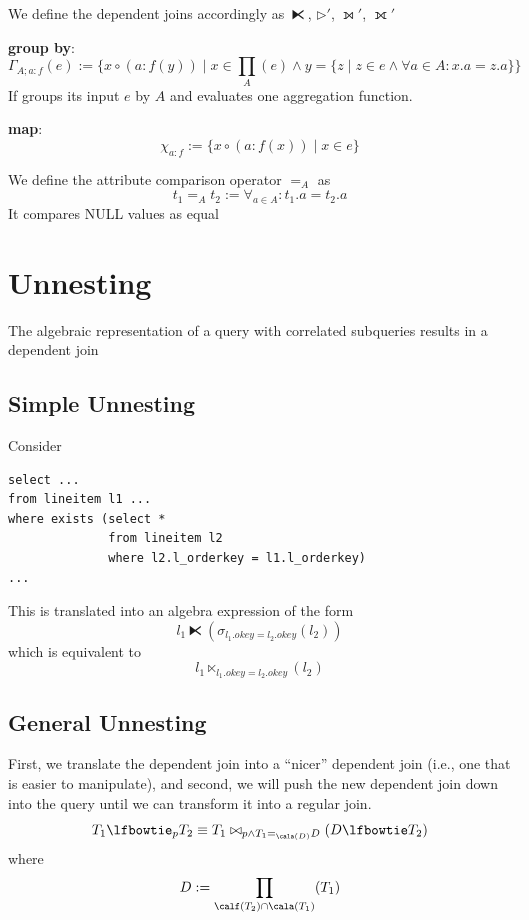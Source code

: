 \documentclass[11pt]{article}
\begin{document}
We define the dependent joins accordingly as \(\lftimes\), \(\rhd'\), \(\leftouterjoin'\), \(\fullouterjoin'\)

\textbf{group by}:
\begin{equation*}
\Gamma_{A;a:f}(e):=\{x\circ(a:f(y))\mid x\in\prod_A(e)\wedge y=\{z\mid z\in e\wedge\forall a\in A:x.a=z.a\}\}
\end{equation*}
If groups its input \(e\) by \(A\) and evaluates one aggregation function.

\textbf{map}:
\begin{equation*}
\chi_{a:f}:=\{x\circ(a:f(x))\mid x\in e\}
\end{equation*}

We define the attribute comparison operator \(=_A\) as
\begin{equation*}
t_1=_At_2:=\forall_{a\in A}:t_1.a=t_2.a
\end{equation*}
It compares NULL values as equal
\section{Unnesting}
\label{sec:org71023ad}
The algebraic representation of a query with correlated subqueries results in a dependent join
\subsection{Simple Unnesting}
\label{sec:orga6312bc}
Consider
\begin{verbatim}
select ...
from lineitem l1 ...
where exists (select *
              from lineitem l2
              where l2.l_orderkey = l1.l_orderkey)
...
\end{verbatim}
This is translated into an algebra expression of the form
\begin{equation*}
l_1\lftimes(\sigma_{l_1.okey=l_2.okey}(l_2))
\end{equation*}
which is equivalent to
\begin{equation*}
l_1\ltimes_{l_1.okey=l_2.okey}(l_2)
\end{equation*}
\subsection{General Unnesting}
\label{sec:orgfc960cf}
First, we translate the dependent join into a “nicer” dependent join (i.e., one that is easier to
manipulate), and second, we will push the new dependent join down into the query until we can
transform it into a regular join.
\begin{equation*}
T_1\lfbowtie_pT_2\equiv T_1\bowtie_{p\wedge T_1=_{\cala(D)}D}(D\lfbowtie T_2)
\end{equation*}
where
\begin{equation*}
D:=\prod_{\calf(T_2)\cap\cala(T_1)}(T_1)
\end{equation*}
\end{document}

